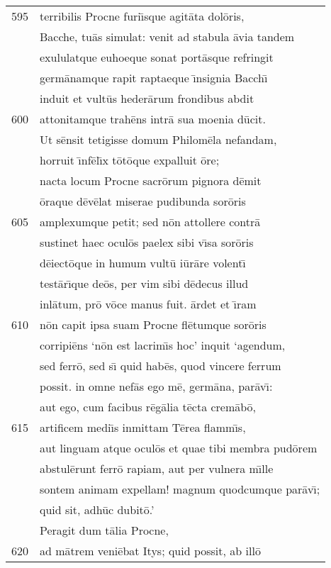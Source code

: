\documentclass[paper=6in:9in,pagesize=pdftex,
               headinclude=on,footinclude=on,12pt]{scrbook}
\begin{document}
\begin{longtable}[p]{ r l }
595 & terribilis Procne furi\={\i}sque agit\=ata dol\=oris,\\ 
 & Bacche, tu\=as simulat: venit ad stabula \=avia tandem\\ 
 & exululatque euhoeque sonat port\=asque refringit\\ 
 & germ\=anamque rapit raptaeque \={\i}nsignia Bacch\={\i}\\ 
 & induit et vult\=us heder\=arum frondibus abdit\\ 
600 & attonitamque trah\=ens intr\=a sua moenia d\=ucit.\\ 
 & \indent Ut s\=ensit tetigisse domum Philom\=ela nefandam,\\ 
 & horruit \={\i}nf\=el\={\i}x t\=ot\=oque expalluit \=ore;\\ 
 & nacta locum Procne sacr\=orum pignora d\=emit\\ 
 & \=oraque d\=ev\=elat miserae pudibunda sor\=oris\\ 
605 & amplexumque petit; sed n\=on attollere contr\=a\\ 
 & sustinet haec ocul\=os paelex sibi v\={\i}sa sor\=oris\\ 
 & d\=eiect\=oque in humum vult\=u i\=ur\=are volent\={\i}\\ 
 & test\=ar\={\i}que de\=os, per vim sibi d\=edecus illud\\ 
 & inl\=atum, pr\=o v\=oce manus fuit. \=ardet et \={\i}ram\\ 
610 & n\=on capit ipsa suam Procne fl\=etumque sor\=oris\\ 
 & corripi\=ens `n\=on est lacrim\={\i}s hoc' inquit `agendum,\\ 
 & sed ferr\=o, sed s\={\i} quid hab\=es, quod vincere ferrum\\ 
 & possit. in omne nef\=as ego m\=e, germ\=ana, par\=av\={\i}:\\ 
 & aut ego, cum facibus r\=eg\=alia t\=ecta crem\=ab\=o,\\ 
615 & artificem medi\={\i}s inmittam T\=erea flamm\={\i}s,\\ 
 & aut linguam atque ocul\=os et quae tibi membra pud\=orem\\ 
 & abstul\=erunt ferr\=o rapiam, aut per vulnera m\={\i}lle\\ 
 & sontem animam expellam! magnum quodcumque par\=av\={\i};\\ 
 & quid sit, adh\=uc dubit\=o.'\\ 
 & \indent Peragit dum t\=alia Procne,\\ 
620 & ad m\=atrem veni\=ebat Itys; quid possit, ab ill\=o\\ 

\end{longtable}
\end{document}
